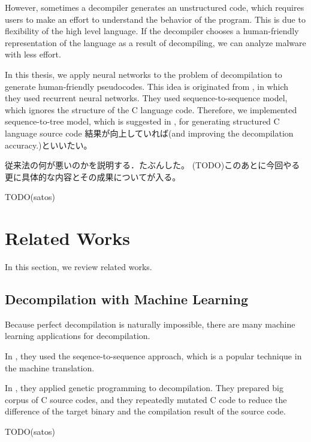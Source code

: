 \documentclass[senior,final,11pt]{iscs-thesis}
\begin{document}
However, sometimes a decompiler generates an unstructured code, which requires users to make an effort to understand the behavior of the program. 
This is due to flexibility of the high level language. If the decompiler chooses a human-friendly representation of the language as a result of decompiling, we can analyze malware with less effort. 

In this thesis, we apply neural networks to the problem of decompilation to generate human-friendly pseudocodes. 
This idea is originated from \cite{Motoneta}, in which they used recurrent neural networks.
They used sequence-to-sequence model, which ignores the structure of the C language code. 
Therefore, we implemented sequence-to-tree model, which is suggested in \cite{Seq2Tree}, for generating structured C language source code 
結果が向上していれば(and improving the decompilation accuracy.)といいたい。

従来法の何が悪いのかを説明する．たぶんした。
(TODO)このあとに今回やる更に具体的な内容とその成果についてが入る。

TODO(satos)


\section{Related Works}
In this section, we review related works.

\subsection{Decompilation with Machine Learning}

Because perfect decompilation is naturally impossible, there are many machine learning applications for decompilation.

In \cite{Motoneta}, they used the seqence-to-sequence approach, which is a popular technique in the machine translation.

In \cite{genetic_decompiler}, they applied genetic programming to decompilation.
They prepared big corpus of C source codes, and they repeatedly mutated C code to reduce the difference of the target binary and the compilation result of the source code. 

TODO(satos)




% 
\end{document}
